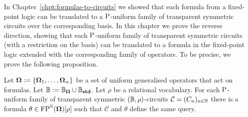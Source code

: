 \documentclass[../main/thesis.tex]{subfiles}
\begin{document}

In Chapter~\ref{chpt:formulas-to-circuits} we showed that each formula from a
fixed-point logic can be translated to a $\mathrm{P}$-uniform family of transparent
symmetric circuits over the corresponding basis. In this chapter we prove the
reverse direction, showing that each $\mathrm{P}$-uniform family of transparent
symmetric circuits (with a restriction on the basis) can be translated to a
formula in the fixed-point logic extended with the corresponding family of
operators. To be precise, we prove the following proposition.

\begin{prop}
  Let $\mathbf{\mathbf{\Omega}} := \{\mathbf{\mathbf{\Omega}}_1, \ldots, \mathbf{\mathbf{\Omega}}_w\}$ be a set of uniform generalised
  operators that act on formulas. Let $\mathbb{B} := \mathbb{B}_{\mathbf{\mathbf{\Omega}}} \cup \mathbb{B}_{\text{\textbf{std}}}$. Let
  $\rho$ be a relational vocabulary. For each $\mathrm{P}$-uniform family of
  transparent symmetric $(\mathbb{B}, \rho)$-circuits $\mathcal{C} = (C_n)_{n \in
    \mathbb{N}}$ there is a formula $\theta \in \text{\upshape FP}^{\mathbb{N}}(\mathbf{\mathbf{\Omega}})[\rho]$ such that
  $\mathcal{C}$ and $\theta$ define the same query.
  \label{prop:translate-circuits-to-formulas}
\end{prop}

\end{document}
